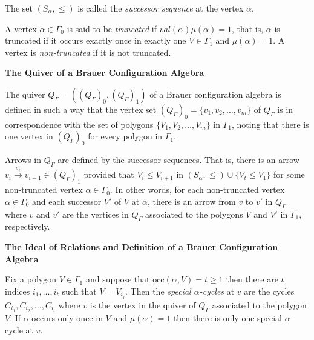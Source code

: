 \documentclass[10pt,twoside]{article}
\theoremstyle{definition}
\begin{document}
The set $(S_{\alpha},\leq)$ is called the \textit{successor sequence} at the vertex $\alpha$.\par\bigskip


A vertex $\alpha\in\Gamma_{0}$ is said to be \textit{truncated} if $val(\alpha)\mu(\alpha)=1$, that is, $\alpha$ is truncated if it occurs exactly once in exactly one $V\in\Gamma_{1}$ and $\mu(\alpha)=1$. A vertex is \textit{non-truncated} if it is not truncated.

\begin{center}
\textbf{The Quiver of a Brauer Configuration Algebra}
\end{center}

The quiver $Q_{\Gamma}=((Q_{\Gamma})_{0},(Q_{\Gamma})_{1})$ of a Brauer configuration algebra is defined in such a way that the vertex set $(Q_{\Gamma})_{0}=\{v_{1},v_{2},\dots,v_{m}\}$ of $Q_{\Gamma}$ is in correspondence with the set of polygons $\{V_{1},V_{2},\dots,V_{m}\}$ in $\Gamma_{1}$, noting that there is one vertex in $(Q_{\Gamma})_{0}$ for every polygon in $\Gamma_{1}$.\par\bigskip

Arrows in $Q_{\Gamma}$ are defined by the successor sequences. That is, there is an arrow $v_{i}\stackrel{s_{i}}{\longrightarrow}v_{i+1}\in (Q_{\Gamma})_{1}$ provided that $V_{i}\leq V_{i+1}$ in $(S_{\alpha},\leq)\cup\{V_{t}\leq V_{1}\}$ for some non-truncated vertex $\alpha\in\Gamma_{0}$. In other words, for each non-truncated vertex $\alpha\in\Gamma_{0}$ and each successor $V'$ of $V$ at $\alpha$, there is an arrow from $v$ to $v'$ in $Q_{\Gamma}$ where $v$ and $v'$ are the vertices in $Q_{\Gamma}$ associated to the polygons $V$ and $V'$ in $\Gamma_{1}$, respectively.\par\bigskip

\begin{centering}
\textbf{The Ideal of Relations and Definition of a Brauer Configuration Algebra}\par\bigskip
\end{centering}

Fix a polygon $V\in\Gamma_{1}$ and suppose that $\mathrm{occ}(\alpha,V)=t\geq1$ then there are $t$ indices
$i_{1},\dots, i_{t}$ such that $V=V_{i_{j}}$. Then the \textit{special $\alpha$-cycles} at $v$ are the cycles $C_{i_{1}}, C_{i_{2}},\dots, C_{i_{t}}$ where $v$ is the vertex in the quiver of $Q_{\Gamma}$ associated to the polygon $V$.
If $\alpha$ occurs only once in $V$ and $\mu(\alpha)=1$ then there is only one special $\alpha$-cycle at $v$.
\end{document}
